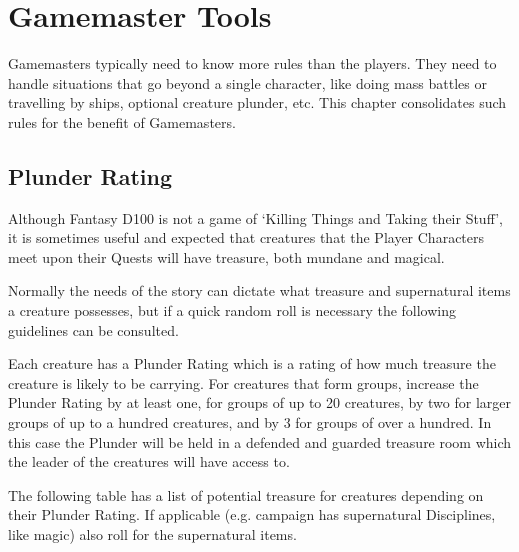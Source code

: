 \chapter{Gamemaster Tools}
\label{ch:more-rules-advice}

Gamemasters typically need to know more rules than the players. They need to handle situations that go beyond a single character, like doing mass battles or travelling by ships, optional creature plunder, etc. This chapter consolidates such rules for the benefit of Gamemasters.


\section{Plunder Rating}

Although Fantasy D100 is not a game of ‘Killing Things and Taking their Stuff’, it is sometimes useful and expected that creatures that the Player Characters meet upon their Quests will have treasure, both mundane and magical.

Normally the needs of the story can dictate what treasure and supernatural items a creature possesses, but if a quick random roll is necessary the following guidelines can be consulted.

Each creature has a Plunder Rating which is a rating of how much treasure the creature is likely to be carrying. For creatures that form groups, increase the Plunder Rating by at least one, for groups of up to 20 creatures, by two for larger groups of up to a hundred creatures, and by 3 for groups of over a hundred. In this case the Plunder will be held in a defended and guarded treasure room which the leader of the creatures will have access to.

The following table has a list of potential treasure for creatures depending on their Plunder Rating. If applicable (e.g. campaign has supernatural Disciplines, like magic) also roll for the supernatural items.

